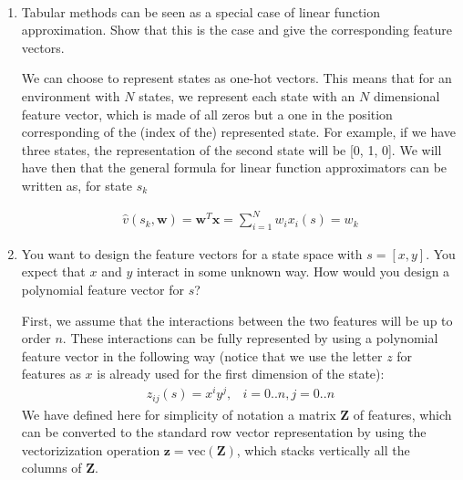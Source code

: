 \documentclass{exam}
\begin{document}
\begin{problem}
\ \newline
\begin{enumerate}
    \item Tabular methods can be seen as a special case of linear function approximation. Show that this is the case and give the corresponding feature vectors.
            \begin{solutionorlines}[2in]
                We can choose to represent states as one-hot vectors. This means that for an environment with $N$ states, we represent each state with an $N$ dimensional feature vector, which is made of all zeros but a one in the position corresponding of the (index of the) represented state. For example, if we have three states, the representation of the second state will be [0, 1, 0].
                We will have then that the general formula for linear function approximators can be written as, for state $s_k$
                
                \begin{align*}
                \hat{v}(s_k, \mathbf{w}) = \mathbf{w}^T \mathbf{x} = \sum_{i=1}^N w_i x_i(s) = w_k
                \end{align*}
            \end{solutionorlines}
    \item You want to design the feature vectors for a state space with $s = [x, y]$. You expect that $x$ and $y$ interact in some unknown way. How would you design a polynomial feature vector for $s$?
            \begin{solutionorlines}[2in]
                First, we assume that the interactions between the two features will be up to order $n$. These interactions can be fully represented by using a polynomial feature vector in the following way (notice that we use the letter $z$ for features as $x$ is already used for the first dimension of the state):
                \begin{align*}
                    z_{ij}(s) =  x^i y^j, & i=0..n, j=0..n
                \end{align*}
                We have defined here for simplicity of notation a matrix $\mathbf{Z}$ of features, which can be converted to the standard row vector representation by using the vectorizization operation $\mathbf{z} = \text{vec}(\mathbf{Z}) $, which stacks vertically all the columns of $\mathbf{Z}$.
                

\end{solutionorlines}
\end{enumerate}
\end{problem}
\end{document}
